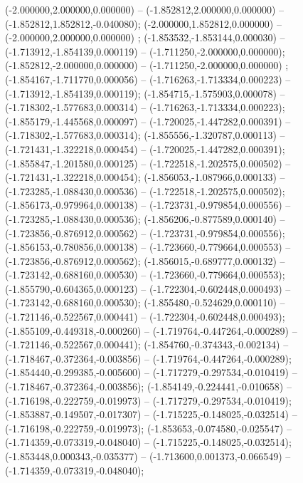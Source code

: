  (-2.000000,2.000000,0.000000) -- (-1.852812,2.000000,0.000000) -- (-1.852812,1.852812,-0.040080);
 (-2.000000,1.852812,0.000000) -- (-2.000000,2.000000,0.000000) ;
 (-1.853532,-1.853144,0.000030) -- (-1.713912,-1.854139,0.000119) -- (-1.711250,-2.000000,0.000000);
 (-1.852812,-2.000000,0.000000) -- (-1.711250,-2.000000,0.000000) ;
 (-1.854167,-1.711770,0.000056) -- (-1.716263,-1.713334,0.000223) -- (-1.713912,-1.854139,0.000119);
 (-1.854715,-1.575903,0.000078) -- (-1.718302,-1.577683,0.000314) -- (-1.716263,-1.713334,0.000223);
 (-1.855179,-1.445568,0.000097) -- (-1.720025,-1.447282,0.000391) -- (-1.718302,-1.577683,0.000314);
 (-1.855556,-1.320787,0.000113) -- (-1.721431,-1.322218,0.000454) -- (-1.720025,-1.447282,0.000391);
 (-1.855847,-1.201580,0.000125) -- (-1.722518,-1.202575,0.000502) -- (-1.721431,-1.322218,0.000454);
 (-1.856053,-1.087966,0.000133) -- (-1.723285,-1.088430,0.000536) -- (-1.722518,-1.202575,0.000502);
 (-1.856173,-0.979964,0.000138) -- (-1.723731,-0.979854,0.000556) -- (-1.723285,-1.088430,0.000536);
 (-1.856206,-0.877589,0.000140) -- (-1.723856,-0.876912,0.000562) -- (-1.723731,-0.979854,0.000556);
 (-1.856153,-0.780856,0.000138) -- (-1.723660,-0.779664,0.000553) -- (-1.723856,-0.876912,0.000562);
 (-1.856015,-0.689777,0.000132) -- (-1.723142,-0.688160,0.000530) -- (-1.723660,-0.779664,0.000553);
 (-1.855790,-0.604365,0.000123) -- (-1.722304,-0.602448,0.000493) -- (-1.723142,-0.688160,0.000530);
 (-1.855480,-0.524629,0.000110) -- (-1.721146,-0.522567,0.000441) -- (-1.722304,-0.602448,0.000493);
 (-1.855109,-0.449318,-0.000260) -- (-1.719764,-0.447264,-0.000289) -- (-1.721146,-0.522567,0.000441);
 (-1.854760,-0.374343,-0.002134) -- (-1.718467,-0.372364,-0.003856) -- (-1.719764,-0.447264,-0.000289);
 (-1.854440,-0.299385,-0.005600) -- (-1.717279,-0.297534,-0.010419) -- (-1.718467,-0.372364,-0.003856);
 (-1.854149,-0.224441,-0.010658) -- (-1.716198,-0.222759,-0.019973) -- (-1.717279,-0.297534,-0.010419);
 (-1.853887,-0.149507,-0.017307) -- (-1.715225,-0.148025,-0.032514) -- (-1.716198,-0.222759,-0.019973);
 (-1.853653,-0.074580,-0.025547) -- (-1.714359,-0.073319,-0.048040) -- (-1.715225,-0.148025,-0.032514);
 (-1.853448,0.000343,-0.035377) -- (-1.713600,0.001373,-0.066549) -- (-1.714359,-0.073319,-0.048040);
